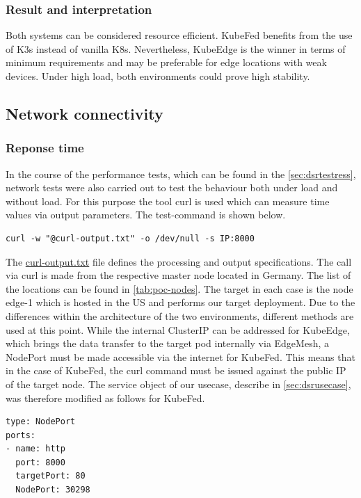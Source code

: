 \documentclass[MIC,Master,english]{twbook}%
\begin{document}
\subsubsection{Result and interpretation} 
Both systems can be considered resource efficient. KubeFed benefits from the use of K3s instead of vanilla K8s. Nevertheless, KubeEdge is the winner in terms of minimum requirements and may be preferable for edge locations with weak devices. Under high load, both environments could prove high stability.

\subsection{Network connectivity}
\label{sec:dsrtestnetwork}
\subsubsection{Reponse time}
In the course of the performance tests, which can be found in the \autoref{sec:dsrtestress}, network tests were also carried out to test the behaviour both under load and without load. For this purpose the tool curl is used which can measure time values via output parameters. The test-command is shown below.

\begin{lstlisting}[caption={Curl command},captionpos=b]
curl -w "@curl-output.txt" -o /dev/null -s IP:8000
\end{lstlisting}

The \hyperref{https://github.com/Berndinox/K8sEdge/blob/main/Tests/network/curl.md}{}{}{curl-output.txt}\cite{bk-gh-curl} file defines the processing and output specifications. The call via curl is made from the respective master node located in Germany. The list of the locations can be found in \autoref{tab:poc-nodes}. The target in each case is the node edge-1 which is hosted in the US and performs our target deployment. Due to the differences within the architecture of the two environments, different methods are used at this point. While the internal ClusterIP can be addressed for KubeEdge, which brings the data transfer to the target pod internally via EdgeMesh, a NodePort must be made accessible via the internet for KubeFed. This means that in the case of KubeFed, the curl command must be issued against the public IP of the target node. The service object of our usecase, describe in \autoref{sec:dsrusecase}, was therefore modified as follows for KubeFed.

\begin{lstlisting}[caption={Curl command},captionpos=b]
type: NodePort
ports:
- name: http
  port: 8000
  targetPort: 80
  NodePort: 30298
\end{lstlisting}
\end{document}
